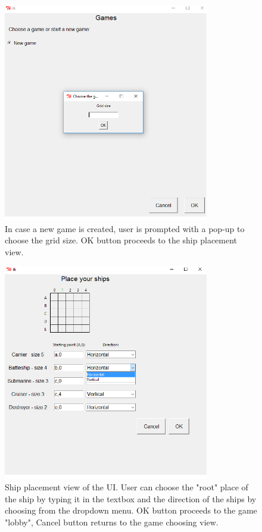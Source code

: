 \documentclass[]{article}
\begin{document}
\begin{figure}[!hbt]
	\centering
	\includegraphics[width=0.8\textwidth]{GridSize.png}
	\caption{In case a new game is created, user is prompted with a pop-up to choose the grid size. OK button proceeds to the ship placement view.}
	\label{fig:Gridsize}
\end{figure}

\begin{figure}[!hbt]
	\centering
	\includegraphics[width=0.8\textwidth]{ShipPlace.png}
	\caption{Ship placement view of the UI. User can choose the "root" place of the ship by typing it in the textbox and the direction of the ships by choosing from the dropdown menu. OK button proceeds to the game "lobby", Cancel button returns to the game choosing view.}
	\label{fig:ShipPlace}
\end{figure}
\end{document}
